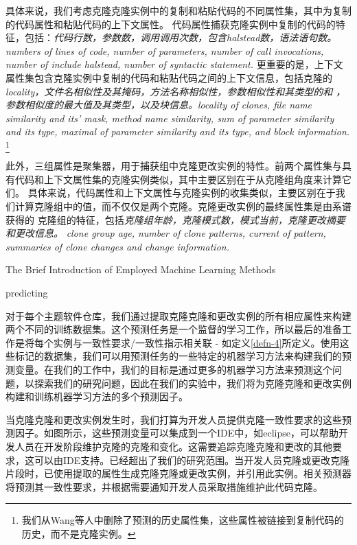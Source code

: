 具体来说，我们考虑克隆克隆实例中的复制和粘贴代码的不同属性集，其中为复制的代码属性和粘贴代码的上下文属性。
代码属性捕获克隆实例中复制的代码的特征，包括：{\em 代码行数，参数数，调用调用次数，包含halstead数，语法语句数。}
{\em numbers of lines of code, number of parameters, number of call invocations, number of include halstead, number of syntactic statement.}
更重要的是，上下文属性集包含克隆实例中复制的代码和粘贴代码之间的上下文信息，包括克隆的{\em locality，文件名相似性及其掩码，方法名称相似性，参数相似性和其类型的和 ，参数相似度的最大值及其类型，以及块信息。}{\em locality of clones, file name similarity and its' mask, method name similarity, sum of parameter similarity and its type, maximal of parameter similarity and its type, and block information.} \footnote{我们从Wang等人中删除了预测的历史属性集，这些属性被链接到复制代码的历史，而不是克隆实例。}

此外，三组属性是聚集器，用于捕获组中克隆更改实例的特性。前两个属性集与具有代码和上下文属性集的克隆实例类似，其中主要区别在于从克隆组角度来计算它们。
具体来说，代码属性和上下文属性与克隆实例的收集类似，主要区别在于我们计算克隆组中的值，而不仅仅是两个克隆。克隆更改实例的最终属性集是由系谱获得的
克隆组的特征，包括{\em 克隆组年龄，克隆模式数，模式当前，克隆更改摘要和更改信息。}
{\em clone group age, number of clone patterns, current of pattern, summaries of clone changes and change information.}



{The Brief Introduction of Employed Machine Learning Methods}



{predicting}

对于每个主题软件仓库，我们通过提取克隆克隆和更改实例的所有相应属性来构建两个不同的训练数据集。这个预测任务是一个监督的学习工作，所以最后的准备工作是将每个实例与一致性要求/一致性指示相关联 - 如定义\ref {defn-4}所定义。使用这些标记的数据集，我们可以用预测任务的一些特定的机器学习方法来构建我们的预测变量。在我们的工作中，我们的目标是通过更多的机器学习方法来预测这个问题，以探索我们的研究问题，因此在我们的实验中，我们将为克隆克隆和更改实例构建和训练机器学习方法的多个预测因子。

当克隆克隆和更改实例发生时，我们打算为开发人员提供克隆一致性要求的这些预测因子。如图所示，这些预测变量可以集成到一个IDE中，如eclipse，可以帮助开发人员在开发阶段维护克隆的克隆和变化。这需要追踪克隆克隆和更改的其他要求，这可以由IDE支持。已经超出了我们的研究范围。当开发人员克隆或更改克隆片段时，已使用提取的属性生成克隆克隆或更改实例，并引用此实例。相关预测器将预测其一致性要求，并根据需要通知开发人员采取措施维护此代码克隆。

